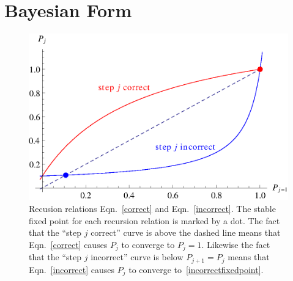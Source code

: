 \documentclass[11pt,letterpaper]{article}
\begin{document}
\section{Bayesian Form}

\begin{figure}
\centering\includegraphics{p-recursion.eps}
\caption{
  Recusion relations Eqn.~\ref{correct} and Eqn.~\ref{incorrect}.
  The stable fixed point for each recursion relation is marked
  by a dot.  The fact that the ``step $j$ correct'' curve is above the
  dashed line means that Eqn.~\ref{correct} causes $P_j$ to 
   converge to $P_j=1$.  Likewise the fact that 
   the ``step $j$ incorrect'' curve is below $P_{j+1}=P_j$ means that 
   Eqn.~\ref{incorrect} causes $P_j$ to converge to~\ref{incorrectfixedpoint}.
 }
 \label{p-recursion}
\end{figure}
\end{document}
